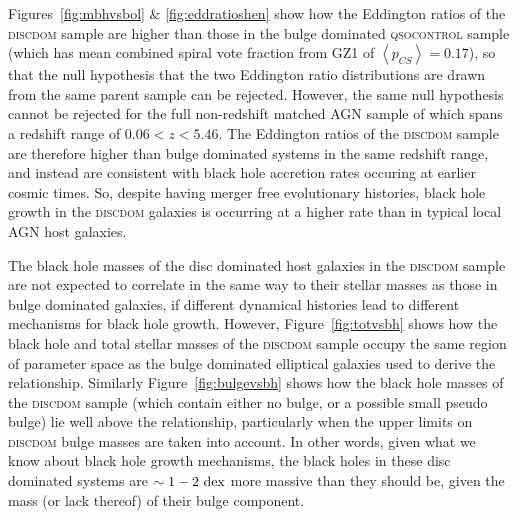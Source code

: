 {Figures~\ref{fig:mbhvsbol} \& \ref{fig:eddratioshen} show how the Eddington ratios of the \textsc{discdom} sample are higher than those in the bulge dominated \textsc{qsocontrol} sample (which has mean combined spiral vote fraction from GZ1 of $\left<p_{CS} \right> = 0.17$), so that the null hypothesis that the two Eddington ratio distributions are drawn from the same parent sample can be rejected. However, the same null hypothesis cannot be rejected for the full non-redshift matched AGN sample of \citet{shen11} which spans a redshift range of $0.06 < z < 5.46$. The Eddington ratios of the \textsc{discdom} sample are therefore higher than bulge dominated systems in the same redshift range, and instead are consistent with black hole accretion rates occuring at earlier cosmic times. So, despite having merger free evolutionary histories, black hole growth in the \textsc{discdom} galaxies is occurring at a higher rate than in typical local AGN host galaxies.  

The black hole masses of the disc dominated host galaxies in the \textsc{discdom} sample are not expected to correlate in the same way to their stellar masses as those in bulge dominated galaxies, if different dynamical histories lead to different mechanisms for black hole growth. However, Figure~\ref{fig:totvsbh} shows how the black hole and total stellar masses of the \textsc{discdom} sample occupy the same region of parameter space as the bulge dominated elliptical galaxies used to derive the \citet{haringrix04} relationship. Similarly Figure~\ref{fig:bulgevsbh} shows how the black hole masses of the \textsc{discdom} sample (which contain either no bulge, or a possible small pseudo bulge) lie well above the \citet{haringrix04} relationship, particularly when the upper limits on \textsc{discdom} bulge masses are taken into account. In other words, given what we know about black hole growth mechanisms, the black holes in these disc dominated systems are $\sim1-2~\rm{dex}$ more massive than they should be, given the mass (or lack thereof) of their bulge component. 

}
